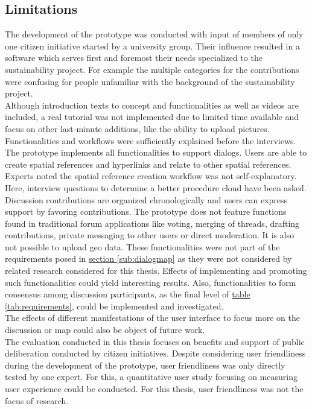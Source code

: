 \subsection{Limitations}
\label{sub:limitations}
The development of the prototype was conducted with input of members of only one citizen initiative started by a university group. Their influence resulted in a software which serves first and foremost their needs specialized to the sustainability project. For example the multiple categories for the contributions were confusing for people unfamiliar with the background of the sustainability project.\\
Although introduction texts to concept and functionalities as well as videos are included, a real tutorial was not implemented due to limited time available and focus on other last-minute additions, like the ability to upload pictures. Functionalities and workflows were sufficiently explained before the interviews.\\
The prototype implements all functionalities to support dialogs. Users are able to create spatial references and hyperlinks and relate to other spatial references. Experts noted the spatial reference creation workflow was not self-explanatory. Here, interview questions to determine a better procedure cloud have been asked.\\ Discussion contributions are organized chronologically and users can express support by favoring contributions. The prototype does not feature functions found in traditional forum applications like voting, merging of threads, drafting contributions, private messaging to other users or direct moderation. It is also not possible to upload geo data. These functionalities were not part of the requirements posed in \hyperref[sub:dialogmap]{section \ref{sub:dialogmap}} as they were not considered by related research considered for this thesis. Effects of implementing and promoting such functionalities could yield interesting results. Also, functionalities to form consensus among discussion participants, as the final level of \hyperref[tab:requirements]{table \ref{tab:requirements}}, could be implemented and investigated.\\
The effects of different manifestations of the user interface to focus more on the discussion or map could also be object of future work.\\
The evaluation conducted in this thesis focuses on benefits and support of public deliberation conducted by citizen initiatives. Despite considering user friendliness during the development of the prototype, user friendliness was only directly tested by one expert. For this, a quantitative user study focusing on measuring user experience could be conducted. For this thesis, user friendliness was not the focus of research.\\

